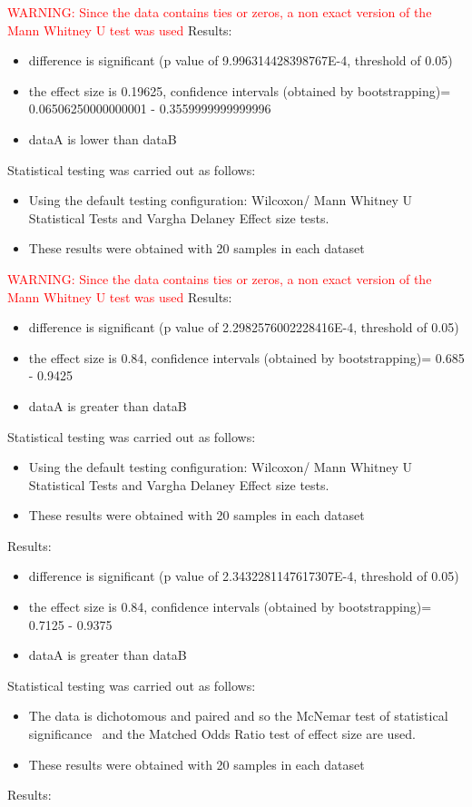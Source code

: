 \documentclass[]{article}
\begin{document}
\textcolor{Red}{WARNING: Since the data contains ties or zeros, a non exact version of the Mann Whitney U test was used}
Results:
\begin{itemize}
\item{difference is significant (p value of 9.996314428398767E-4, threshold of 0.05)}
\item{the effect size is 0.19625, confidence intervals (obtained by bootstrapping)= 0.06506250000000001 - 0.3559999999999996}
\item{dataA is lower than dataB}
\end{itemize}Statistical testing was carried out as follows: \begin{itemize}
\item{Using the default testing configuration: Wilcoxon/ Mann Whitney U Statistical Tests and Vargha Delaney Effect size tests.}
\item{These results were obtained with 20 samples in each dataset}
\end{itemize}
\textcolor{Red}{WARNING: Since the data contains ties or zeros, a non exact version of the Mann Whitney U test was used}
Results:
\begin{itemize}
\item{difference is significant (p value of 2.2982576002228416E-4, threshold of 0.05)}
\item{the effect size is 0.84, confidence intervals (obtained by bootstrapping)= 0.685 - 0.9425}
\item{dataA is greater than dataB}
\end{itemize}Statistical testing was carried out as follows: \begin{itemize}
\item{Using the default testing configuration: Wilcoxon/ Mann Whitney U Statistical Tests and Vargha Delaney Effect size tests.}
\item{These results were obtained with 20 samples in each dataset}
\end{itemize}Results:
\begin{itemize}
\item{difference is significant (p value of 2.3432281147617307E-4, threshold of 0.05)}
\item{the effect size is 0.84, confidence intervals (obtained by bootstrapping)= 0.7125 - 0.9375}
\item{dataA is greater than dataB}
\end{itemize}Statistical testing was carried out as follows: \begin{itemize}
\item{The data is dichotomous and paired and so the McNemar test of statistical significance~\cite{Gibbons2011} and the Matched Odds Ratio test of effect size are used.}
\item{These results were obtained with 20 samples in each dataset}
\end{itemize}Results:
\end{document}
